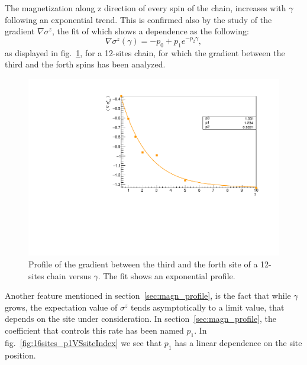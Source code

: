 The magnetization along z direction of every spin of the chain, increases with $\gamma$ following an exponential trend. This is confirmed also by the study of the gradient $\nabla \sigma^z$, the fit of which shows a dependence as the following:
\begin{equation*}
    \nabla \sigma^z (\gamma) = - p_0 + p_1 e^{-p_2\gamma},
\end{equation*}
as displayed in fig.~\ref{fig:FIT_12sites_gradLM34VSgamma}, for a 12-sites chain, for which the gradient between the third and the forth spins has been analyzed.
\begin{figure}[H]
    \centering
    \captionsetup{width=1.\linewidth}
    \includegraphics[scale=0.6]{Figures/12sites/12sites_gradLM_3and4VSgamma.pdf}
    \caption{Profile of the gradient between the third and the forth site of a 12-sites chain versus $\gamma$. The fit shows an exponential profile.}
    \label{fig:FIT_12sites_gradLM34VSgamma}
\end{figure}

Another feature mentioned in section~\ref{sec:magn_profile}, is the fact that while $\gamma$ grows, the expectation value of $\sigma^z$ tends asymptotically to a limit value, that depends on the site under consideration. In section~\ref{sec:magn_profile}, the coefficient that controls this rate has been named $p_1$. In fig.~\ref{fig:16sites_p1VSsiteIndex} we see that $p_1$ has a linear dependence on the site position.


